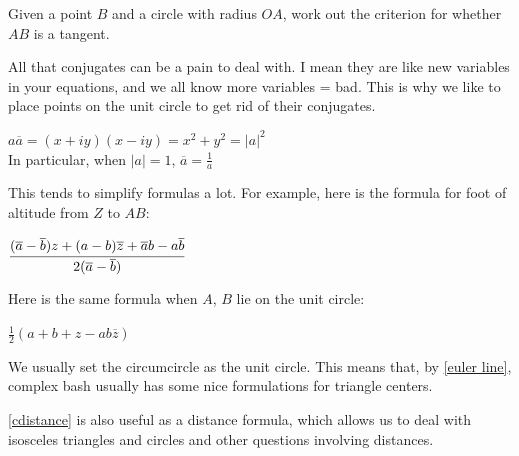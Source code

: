 \documentclass[11pt]{scrartcl}
\begin{document}
\begin{exercise}
  Given a point $B$ and a circle with radius $OA$, work out the criterion for whether $AB$ is a tangent. 
\end{exercise}
All that conjugates can be a pain to deal with. I mean they are like new variables in your equations, and we all know more variables = bad. This is why we like to place points on the unit circle to get rid of their conjugates. 
\begin{proposition} \label{cdistance}
  $a\overline{a}=(x+iy)(x-iy)=x^2+y^2=|a|^2$ \\
  In particular, when $|a|=1$, $\overline{a}=\frac{1}{a}$
\end{proposition}
This tends to simplify formulas a lot. For example, here is the formula for foot of altitude from $Z$ to $AB$:
\begin{center}
  $\cfrac{(\overline{a}-\overline{b})z+(a-b)\overline{z}+\overline{a}b-a\overline{b}}{2(\overline{a}-\overline{b})}$
\end{center}
Here is the same formula when $A$, $B$ lie on the unit circle:
\begin{center}
  $\frac{1}{2}(a+b+z-ab\overline{z})$
\end{center}
We usually set the circumcircle as the unit circle. This means that, by \ref{euler line}, complex bash usually has some nice formulations for triangle centers.
\begin{remark}
  \ref{cdistance} is also useful as a distance formula, which allows us to deal with isosceles triangles and circles and other questions involving distances.
\end{remark}
\end{document}
